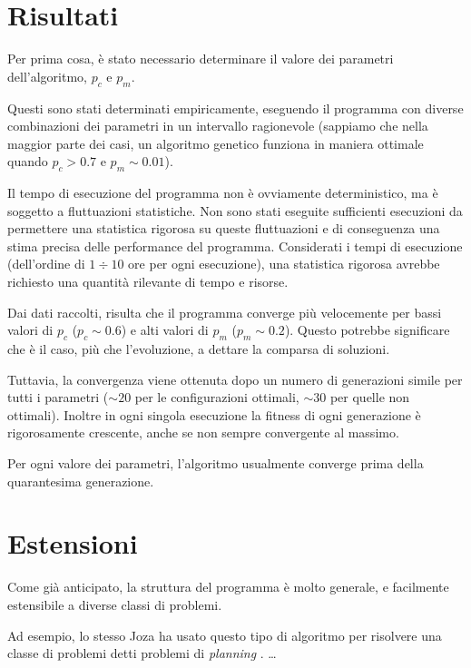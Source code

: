 \documentclass[paper=a4, fontsize=11pt]{scrartcl}
\numberwithin{equation}{section}		%
\numberwithin{figure}{section}			%
\numberwithin{table}{section}				%
\begin{document}
\section{Risultati}
Per prima cosa, è stato necessario determinare il valore dei parametri dell'algoritmo, $p_c$ e $p_m$.

Questi sono stati determinati empiricamente, eseguendo il programma con diverse combinazioni dei parametri in un intervallo ragionevole (sappiamo che nella maggior parte dei casi, un algoritmo genetico funziona in maniera ottimale quando $p_c  > 0.7$ e $p_m \sim 0.01$).

Il tempo di esecuzione del programma non è ovviamente deterministico, ma è soggetto a fluttuazioni statistiche. Non sono stati eseguite sufficienti esecuzioni da permettere una statistica rigorosa su queste fluttuazioni e di conseguenza una stima precisa delle performance del programma. Considerati i tempi di esecuzione (dell'ordine di $1 \div 10$ ore per ogni esecuzione), una statistica rigorosa  avrebbe richiesto una quantità rilevante di tempo e risorse.

Dai dati raccolti, risulta che il programma converge più velocemente per bassi valori di $p_c$ ($p_c \sim 0.6$) e alti valori di $p_m$ ($p_m \sim 0.2$). Questo potrebbe significare che è il caso, più che l'evoluzione, a dettare la comparsa di soluzioni. 

Tuttavia, la convergenza  viene ottenuta dopo un numero di generazioni simile per tutti i parametri ($ \sim 20$ per le configurazioni ottimali, $\sim 30$ per quelle non ottimali). Inoltre in ogni singola esecuzione la fitness di ogni generazione è rigorosamente crescente, anche se non sempre convergente al massimo.




Per ogni valore dei parametri, l'algoritmo usualmente converge prima della quarantesima generazione. 





\section{Estensioni}
Come già anticipato, la struttura del programma è molto generale, e facilmente estensibile a diverse classi di problemi.

Ad esempio, lo stesso Joza ha usato questo tipo di algoritmo per risolvere una classe di problemi detti problemi di \emph{planning}
.
 \dots

\end{document}
